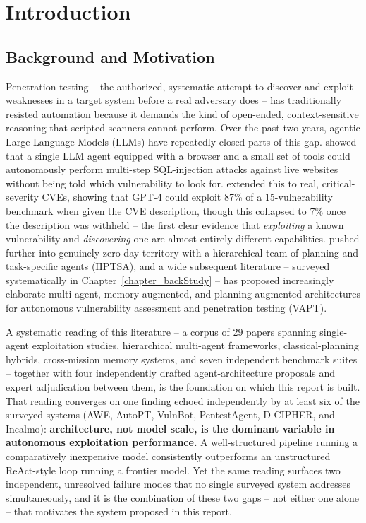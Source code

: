 \chapter{Introduction}
\label{chapter_introduction}

\section{Background and Motivation}
\label{sec:intro_background}

Penetration testing -- the authorized, systematic attempt to discover and exploit weaknesses in a target system before a real adversary does -- has traditionally resisted automation because it demands the kind of open-ended, context-sensitive reasoning that scripted scanners cannot perform. Over the past two years, agentic Large Language Models (LLMs) have repeatedly closed parts of this gap. \citet{fang2024hackwebsites} showed that a single LLM agent equipped with a browser and a small set of tools could autonomously perform multi-step SQL-injection attacks against live websites without being told which vulnerability to look for. \citet{fang2024oneday} extended this to real, critical-severity CVEs, showing that GPT-4 could exploit 87\% of a 15-vulnerability benchmark when given the CVE description, though this collapsed to 7\% once the description was withheld -- the first clear evidence that \emph{exploiting} a known vulnerability and \emph{discovering} one are almost entirely different capabilities. \citet{zhu2024hptsa} pushed further into genuinely zero-day territory with a hierarchical team of planning and task-specific agents (HPTSA), and a wide subsequent literature -- surveyed systematically in Chapter~\ref{chapter_backStudy} -- has proposed increasingly elaborate multi-agent, memory-augmented, and planning-augmented architectures for autonomous vulnerability assessment and penetration testing (VAPT).

A systematic reading of this literature -- a corpus of 29 papers spanning single-agent exploitation studies, hierarchical multi-agent frameworks, classical-planning hybrids, cross-mission memory systems, and seven independent benchmark suites -- together with four independently drafted agent-architecture proposals and expert adjudication between them, is the foundation on which this report is built. That reading converges on one finding echoed independently by at least six of the surveyed systems (AWE, AutoPT, VulnBot, PentestAgent, D-CIPHER, and Incalmo): \textbf{architecture, not model scale, is the dominant variable in autonomous exploitation performance.} A well-structured pipeline running a comparatively inexpensive model consistently outperforms an unstructured ReAct-style loop running a frontier model. Yet the same reading surfaces two independent, unresolved failure modes that no single surveyed system addresses simultaneously, and it is the combination of these two gaps -- not either one alone -- that motivates the system proposed in this report.

